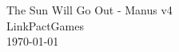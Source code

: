 \documentclass{book}
\begin{document}
\begin{titlepage}
\vfill
\centering
{\Huge The Sun Will Go Out - Manus v4}\\[1cm]
{\Large LinkPactGames}\\[0.6cm]
\today
\vfill
\end{titlepage}
\end{document}

